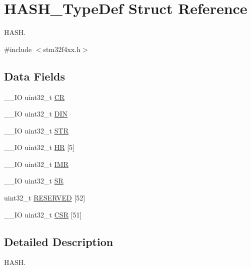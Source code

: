\hypertarget{struct_h_a_s_h___type_def}{\section{H\-A\-S\-H\-\_\-\-Type\-Def Struct Reference}
\label{struct_h_a_s_h___type_def}
}


H\-A\-S\-H.  




{\ttfamily \#include $<$stm32f4xx.\-h$>$}

\subsection*{Data Fields}
\begin{DoxyCompactItemize}
\item 
\-\_\-\-\_\-\-I\-O uint32\-\_\-t \hyperlink{struct_h_a_s_h___type_def_ab40c89c59391aaa9d9a8ec011dd0907a}{C\-R}
\item 
\-\_\-\-\_\-\-I\-O uint32\-\_\-t \hyperlink{struct_h_a_s_h___type_def_a445dd5529e7dc6a4fa2fec4f78da2692}{D\-I\-N}
\item 
\-\_\-\-\_\-\-I\-O uint32\-\_\-t \hyperlink{struct_h_a_s_h___type_def_a7060ac1ed928ee931d7664650f2dcf75}{S\-T\-R}
\item 
\-\_\-\-\_\-\-I\-O uint32\-\_\-t \hyperlink{struct_h_a_s_h___type_def_a02cdb629fbb2bfa63db818ac846847a1}{H\-R} \mbox{[}5\mbox{]}
\item 
\-\_\-\-\_\-\-I\-O uint32\-\_\-t \hyperlink{struct_h_a_s_h___type_def_ae845b86e973b4bf8a33c447c261633f6}{I\-M\-R}
\item 
\-\_\-\-\_\-\-I\-O uint32\-\_\-t \hyperlink{struct_h_a_s_h___type_def_af6aca2bbd40c0fb6df7c3aebe224a360}{S\-R}
\item 
uint32\-\_\-t \hyperlink{struct_h_a_s_h___type_def_a31675cbea6dc1b5f7de162884a4bb6eb}{R\-E\-S\-E\-R\-V\-E\-D} \mbox{[}52\mbox{]}
\item 
\-\_\-\-\_\-\-I\-O uint32\-\_\-t \hyperlink{struct_h_a_s_h___type_def_a5a72a62805d5497f2b44448edd18f20f}{C\-S\-R} \mbox{[}51\mbox{]}
\end{DoxyCompactItemize}


\subsection{Detailed Description}
H\-A\-S\-H. 

